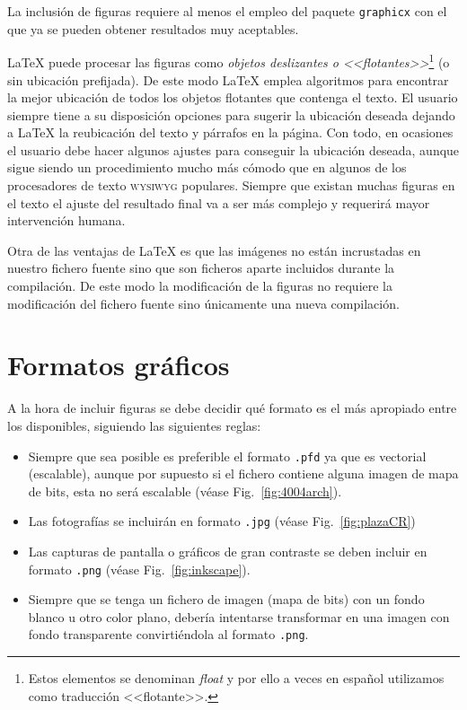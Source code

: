 \documentclass[11pt,a4paper]{article}
\begin{document}
La inclusión de figuras requiere al menos el empleo del paquete \texttt{graphicx} con el que ya se pueden obtener resultados muy aceptables.

\LaTeX{} puede procesar las figuras como \emph{objetos deslizantes o <<flotantes>>}\footnote{Estos elementos se denominan \textit{float} y por ello a veces en español utilizamos como traducción <<flotante>>.} (o sin ubicación prefijada). De este modo \LaTeX{} emplea algoritmos para encontrar la mejor ubicación de todos los objetos flotantes que contenga el texto. El usuario siempre tiene a su disposición opciones para sugerir la ubicación deseada dejando a \LaTeX{} la reubicación del texto y párrafos en la página. Con todo, en ocasiones el usuario debe hacer algunos ajustes para conseguir la ubicación deseada, aunque sigue siendo un procedimiento mucho más cómodo que en algunos de los procesadores de texto \textsc{wysiwyg} populares. Siempre que existan muchas figuras en el texto el ajuste del resultado final va a ser más complejo y requerirá mayor intervención humana.


Otra de las ventajas de \LaTeX{} es que las imágenes no están incrustadas en nuestro fichero fuente sino que son ficheros aparte incluidos durante la compilación. De este modo la modificación de la figuras no requiere la modificación del fichero fuente sino únicamente una nueva compilación.


\section{Formatos gráficos}
A la hora de incluir figuras se debe decidir qué formato es el más apropiado entre los disponibles, siguiendo las siguientes reglas:
\begin{itemize}
	\item Siempre que sea posible es preferible el formato \texttt{.pfd} ya que es vectorial (escalable), aunque por supuesto si el fichero contiene alguna imagen de mapa de bits, esta no será escalable (véase Fig.~\ref{fig:4004arch}).
	\item Las fotografías se incluirán en formato \texttt{.jpg} (véase Fig.~\ref{fig:plazaCR})
	\item Las capturas de pantalla o gráficos de gran contraste se deben incluir en formato \texttt{.png} (véase Fig.~\ref{fig:inkscape}). 
	\item Siempre que se tenga un fichero de imagen (mapa de bits) con un fondo blanco u otro color plano, debería intentarse transformar en una imagen con fondo transparente convirtiéndola al formato \texttt{.png}.
\end{itemize}
\end{document}
